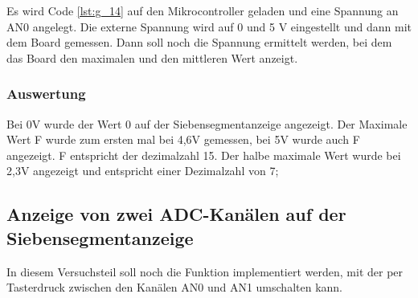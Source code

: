 \documentclass[12pt,a4paper]{article}
\begin{document}
Es wird Code \ref{lst:g_14} auf den Mikrocontroller geladen und eine Spannung an AN0 angelegt. Die externe Spannung wird auf 0 und 5 V eingestellt und dann mit dem Board gemessen. Dann soll noch die Spannung ermittelt werden, bei dem das  Board den maximalen und den mittleren Wert anzeigt.

\subsubsection*{Auswertung}

Bei 0V wurde der Wert 0 auf der Siebensegmentanzeige angezeigt. Der Maximale Wert F wurde zum ersten mal bei 4,6V gemessen, bei 5V wurde auch F angezeigt. F entspricht der dezimalzahl 15. Der halbe maximale Wert wurde bei 2,3V angezeigt und entspricht einer Dezimalzahl von 7;

\subsection{Anzeige von zwei ADC-Kanälen auf der Siebensegmentanzeige}

In diesem Versuchsteil soll noch die Funktion implementiert werden, mit der per Tasterdruck zwischen den Kanälen AN0 und AN1 umschalten kann.
\end{document}
